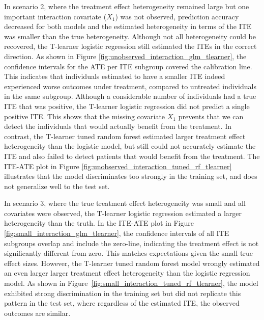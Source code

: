 In scenario 2, where the treatment effect heterogeneity remained large but one important interaction covariate ($X_1$) was not observed, prediction accuracy decreased for both models and the estimated heterogeneity in terms of the ITE was smaller than the true heterogeneity. Although not all heterogeneity could be recovered, the T-learner logistic regression still estimated the ITEs in the correct direction. As shown in Figure \ref{fig:unobserved_interaction_glm_tlearner}, the confidence intervals for the ATE per ITE subgroup covered the calibration line. This indicates that individuals estimated to have a smaller ITE indeed experienced worse outcomes under treatment, compared to untreated individuals in the same subgroup. Although a considerable number of individuals had a true ITE that was positive, the T-learner logistic regression did not predict a single positive ITE. This shows that the missing covariate $X_1$ prevents that we can detect the individuals that would actually benefit from the treatment. In contrast, the T-learner tuned random forest estimated larger treatment effect heterogeneity than the logistic model, but still could not accurately estimate the ITE and also failed to detect patients that would benefit from the treatment. The ITE-ATE plot in Figure \ref{fig:unobserved_interaction_tuned_rf_tlearner} illustrates that the model discriminates too strongly in the training set, and does not generalize well to the test set.



In scenario 3, where the true treatment effect heterogeneity was small and all covariates were observed, the T-learner logistic regression estimated a larger heterogeneity than the truth. In the ITE-ATE plot in Figure \ref{fig:small_interaction_glm_tlearner}, the confidence intervals of all ITE subgroups overlap and include the zero-line, indicating the treatment effect is not significantly different from zero. This matches expectations given the small true effect sizes. However, the T-learner tuned random forest model wrongly estimated an even larger larger treatment effect heterogeneity than the logistic regression model. As shown in Figure~\ref{fig:small_interaction_tuned_rf_tlearner}, the model exhibited strong discrimination in the training set but did not replicate this pattern in the test set, where regardless of the estimated ITE, the observed outcomes are similar.



